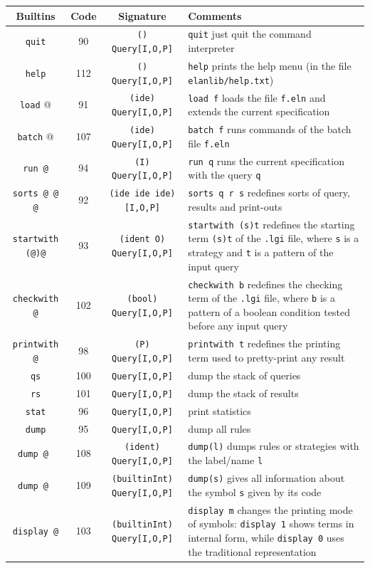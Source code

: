 \noindent \begin{tabular}{|c|c|c|p{6cm}|}
\hline
{\bf Builtins} & {\bf Code} & {\bf Signature} & {\bf Comments} \\
\hline
\hline
{\tt quit}              & 90 & {\tt () Query[I,O,P]} & {\tt quit} just quit the command interpreter\\
{\tt help}              & 112 & {\tt () Query[I,O,P]} & {\tt help} prints the help menu (in the file {\tt elanlib/help.txt}) \\
{\tt load} @            & 91 & {\tt (ide) Query[I,O,P]} & {\tt load f} loads the file {\tt f.eln} and extends the current specification\\
{\tt batch} @           & 107 & {\tt (ide) Query[I,O,P]} & {\tt batch f} runs commands of the batch file {\tt f.eln}\\
{\tt run @}             & 94 & {\tt (I) Query[I,O,P]} & {\tt run q} runs the current specification with the query {\tt q} \\
{\tt sorts @ @ @}       & 92 & {\tt (ide ide ide) [I,O,P]} & {\tt sorts q r s} redefines sorts of query, results and print-outs \\
{\tt startwith (@)@}    & 93 & {\tt (ident O) Query[I,O,P]} & {\tt startwith (s)t} redefines the  starting  term {\tt (s)t} of the {\tt .lgi} file, where {\tt s} is a strategy and {\tt t} is a pattern of the input query\\
{\tt checkwith @}       & 102 & {\tt (bool) Query[I,O,P]} & {\tt checkwith b} redefines the checking term of the {\tt .lgi} file, where {\tt b} is a pattern of a boolean condition tested before any input query\\
{\tt printwith @}       & 98 & {\tt (P) Query[I,O,P]} & {\tt printwith t} redefines the printing term used to pretty-print any result \\
{\tt qs}                & 100 & {\tt Query[I,O,P]} & dump the stack of queries\\
{\tt rs}                & 101 & {\tt Query[I,O,P]} & dump the stack of results\\
{\tt stat}              & 96 & {\tt Query[I,O,P]} & print statistics\\
{\tt dump}              & 95 & {\tt Query[I,O,P]} & dump all rules\\
{\tt dump @ }           & 108  & {\tt (ident) Query[I,O,P]} & {\tt dump(l)} dumps rules or strategies with the label/name {\tt l}\\
{\tt dump @ }           & 109 & {\tt (builtinInt) Query[I,O,P]} & {\tt dump(s)} gives all information about the symbol {\tt s} given by its code\\
{\tt display @}         & 103 & {\tt (builtinInt) Query[I,O,P]} & {\tt display m} changes the printing mode of symbols: {\tt display 1} shows terms in internal form, while {\tt display 0} uses the traditional representation\\
\hline
\end{tabular}
